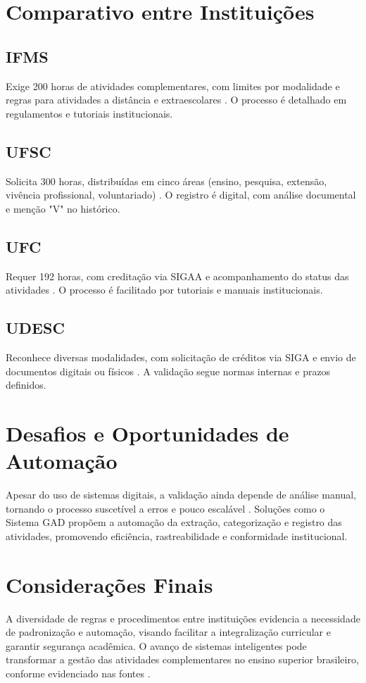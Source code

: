 \section{Comparativo entre Instituições}
\subsection{IFMS}
Exige 200 horas de atividades complementares, com limites por modalidade e regras para atividades a distância e extraescolares \cite{ufsc_sistemas_2024}. O processo é detalhado em regulamentos e tutoriais institucionais.

\subsection{UFSC}
Solicita 300 horas, distribuídas em cinco áreas (ensino, pesquisa, extensão, vivência profissional, voluntariado) \cite{ufsc_sistemas_2024}. O registro é digital, com análise documental e menção "V" no histórico.

\subsection{UFC}
Requer 192 horas, com creditação via SIGAA e acompanhamento do status das atividades \cite{chiele_reconhecimento_2015}. O processo é facilitado por tutoriais e manuais institucionais.

\subsection{UDESC}
Reconhece diversas modalidades, com solicitação de créditos via SIGA e envio de documentos digitais ou físicos \cite{udesc_atividades_2012}. A validação segue normas internas e prazos definidos.

\section{Desafios e Oportunidades de Automação}
Apesar do uso de sistemas digitais, a validação ainda depende de análise manual, tornando o processo suscetível a erros e pouco escalável \cite{bayde_ribeiro_sistemas_2022, udesc_atividades_2012}. Soluções como o Sistema GAD propõem a automação da extração, categorização e registro das atividades, promovendo eficiência, rastreabilidade e conformidade institucional.

\section{Considerações Finais}
 A diversidade de regras e procedimentos entre instituições evidencia a necessidade de padronização e automação, visando facilitar a integralização curricular e garantir segurança acadêmica. O avanço de sistemas inteligentes pode transformar a gestão das atividades complementares no ensino superior brasileiro, conforme evidenciado nas fontes \cite{ufsc_sistemas_2024, bayde_ribeiro_sistemas_2022, udesc_atividades_2012}.
